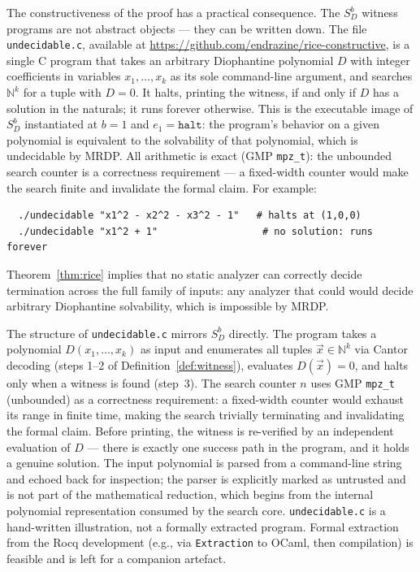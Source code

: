 \documentclass{lmcs}
\begin{document}
The constructiveness of the proof has a practical consequence. The
$S_D^b$ witness programs are not abstract objects --- they can be written
down. The file \texttt{undecidable.c}, available at
\url{https://github.com/endrazine/rice-constructive},
is a single C program that takes an arbitrary Diophantine polynomial
$D$ with integer coefficients in variables $x_1, \ldots, x_k$ as its
sole command-line argument, and searches $\mathbb{N}^k$ for a tuple
with $D = 0$. It halts, printing the witness, if and only if $D$ has a
solution in the naturals; it runs forever otherwise. This is the
executable image of $S_D^b$ instantiated at $b = 1$ and
$e_1 = \mathtt{halt}$: the program's behavior on a given polynomial is
equivalent to the solvability of that polynomial, which is undecidable
by MRDP. All arithmetic is exact (GMP \texttt{mpz\_t}): the unbounded
search counter is a correctness requirement --- a fixed-width counter
would make the search finite and invalidate the formal claim.
For example:
\begin{verbatim}
  ./undecidable "x1^2 - x2^2 - x3^2 - 1"   # halts at (1,0,0)
  ./undecidable "x1^2 + 1"                  # no solution: runs forever
\end{verbatim}
\noindent Theorem~\ref{thm:rice} implies that no static analyzer
can correctly decide termination across the full family of inputs:
any analyzer that could would decide arbitrary Diophantine solvability,
which is impossible by MRDP.

\begin{rem}[Correspondence to $S_D^b$]
\label{rem:correspondence}
The structure of \texttt{undecidable.c} mirrors $S_D^b$ directly.
The program takes a polynomial $D(x_1, \ldots, x_k)$ as input and
enumerates all tuples $\vec{x} \in \mathbb{N}^k$ via Cantor decoding
(steps 1--2 of Definition~\ref{def:witness}), evaluates $D(\vec{x}) = 0$,
and halts only when a witness is found (step~3).
The search counter $n$ uses GMP \texttt{mpz\_t} (unbounded) as a
correctness requirement: a fixed-width counter would exhaust its range
in finite time, making the search trivially terminating and invalidating
the formal claim. Before printing, the witness is re-verified by an
independent evaluation of $D$ --- there is exactly one success path in
the program, and it holds a genuine solution.
The input polynomial is parsed from a command-line string and echoed
back for inspection; the parser is explicitly marked as untrusted and
is not part of the mathematical reduction, which begins from the
internal polynomial representation consumed by the search core.
\texttt{undecidable.c} is a hand-written illustration, not a formally
extracted program. Formal extraction from the Rocq development
(e.g., via \texttt{Extraction} to OCaml, then compilation) is feasible
and is left for a companion artefact.
\end{rem}
\end{document}
